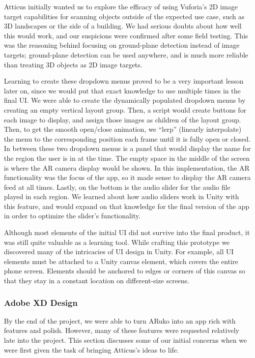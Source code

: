 \documentclass[a4paper, 10pt, american, titlepage]{article}
\begin{document}
Atticus initially wanted us to explore the efficacy of using Vuforia's 2D image
target capabilities for scanning objects outside of the expected use case, such
as 3D landscapes or the side of a building. We had serious doubts about how
well this would work, and our suspicions were confirmed after some field
testing. This was the reasoning behind focusing on ground-plane detection
instead of image targets; ground-plane detection can be used anywhere, and is
much more reliable than treating 3D objects as 2D image targets.

Learning to create these dropdown menus proved to be a very important lesson
later on, since we would put that exact knowledge to use multiple times in the
final UI. We were able to create the dynamically populated dropdown menus by
creating an empty vertical layout group. Then, a script would create buttons for
each image to display, and assign those images as children of the layout group.
Then, to get the smooth open/close animation, we ``lerp'' (linearly interpolate)
the menu to the corresponding position each frame until it is fully open or
closed. In between these two dropdown menus is a panel that would display the
name for the region the user is in at the time. The empty space in the middle of
the screen is where the AR camera display would be shown. In this
implementation, the AR functionality was the focus of the app, so it made sense
to display the AR camera feed at all times. Lastly, on the bottom is the audio
slider for the audio file played in each region. We learned about how audio
sliders work in Unity with this feature, and would expand on that knowledge for
the final version of the app in order to optimize the slider's functionality.

Although most elements of the initial UI did not survive into the final product,
it was still quite valuable as a learning tool. While crafting this prototype we
discovered many of the intricacies of UI design in Unity. For example, all UI
elements must be attached to a Unity canvas element, which covers the entire
phone screen. Elements should be anchored to edges or corners of this canvas so
that they stay in a constant location on different-size screens.

\subsubsection{Adobe XD Design}
\label{sec:adobeXdDesign}

By the end of the project, we were able to turn ARuko into an app rich with
features and polish. However, many of these features were requested relatively
late into the project. This section discusses some of our initial concerns when
we were first given the task of bringing Atticus's ideas to life.
\end{document}
